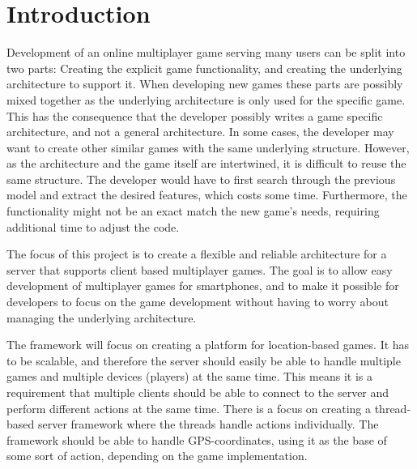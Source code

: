 \chapter{Introduction}
\label{chap:intro}




Development of an online multiplayer game serving many users can be split into two parts: Creating the explicit game functionality, and creating the underlying architecture to support it. When developing new games these parts are possibly mixed together as the underlying architecture is only used for the specific game. This has the consequence that the developer possibly writes a game specific architecture, and not a general architecture. In some cases, the developer may want to create other similar games with the same underlying structure. However, as the architecture and the game itself are intertwined, it is difficult to reuse the same structure. The developer would have to first search through the previous model and extract the desired features, which costs some time. Furthermore, the functionality might not be an exact match the new game's needs, requiring additional time to adjust the code.

The focus of this project is to create a flexible and reliable architecture for a server that supports client based multiplayer games. The goal is to allow easy development of multiplayer games for smartphones, and to make it possible for developers to focus on the game development without having to worry about managing the underlying architecture.

The framework will focus on creating a platform for location-based games. It has to be scalable, and therefore the server should easily be able to handle multiple games and multiple devices (players) at the same time. This means it is a requirement that multiple clients should be able to connect to the server and perform different actions at the same time. There is a focus on creating a thread-based server framework where the threads handle actions individually. The framework should be able to handle GPS-coordinates, using it as the base of some sort of action, depending on the game implementation. 

